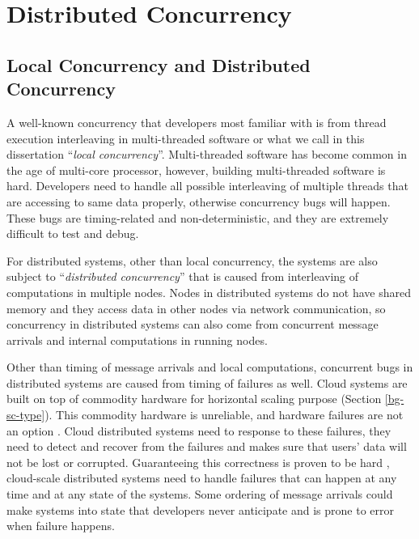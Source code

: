 \section{Distributed Concurrency}
\label{bg-dc}

\subsection{Local Concurrency and Distributed Concurrency}



A well-known concurrency that developers most familiar with is from thread
execution interleaving in multi-threaded software or what we call in this
dissertation ``\textit{local concurrency}''. Multi-threaded software has become
common in the age of multi-core processor, however, building multi-threaded
software is hard. Developers need to handle all possible interleaving of
multiple threads that are accessing to same data properly, otherwise
concurrency bugs will happen. These bugs are timing-related and
non-deterministic, and they are extremely difficult to test and debug.

For distributed systems, other than local concurrency, the systems are also
subject to ``\textit{distributed concurrency}'' that is caused from
interleaving of computations in multiple nodes. Nodes in distributed systems do
not have shared memory and they access data in other nodes via network
communication, so concurrency in distributed systems can also come from
concurrent message arrivals and internal computations in running nodes.

Other than timing of message arrivals and local computations, concurrent bugs
in distributed systems are caused from timing of failures as well. Cloud
systems are built on top of commodity hardware for horizontal scaling purpose
(Section \ref{bg-sc-type}). This commodity hardware is unreliable, and hardware
failures are not an option \cite{Abadi09-Cloud, Gunawi+11-FaaS-TR,
Hamilton07-Deploying}. Cloud distributed systems need to response to these
failures, they need to detect and recover from the failures and makes sure that
users' data will not be lost or corrupted. Guaranteeing this correctness is
proven to be hard \cite{Do+14-Phd, Gunawi+11-FateDestini}, cloud-scale
distributed systems need to handle failures that can happen at any time and at
any state of the systems. Some ordering of message arrivals could make systems
into state that developers never anticipate and is prone to error when failure
happens.

